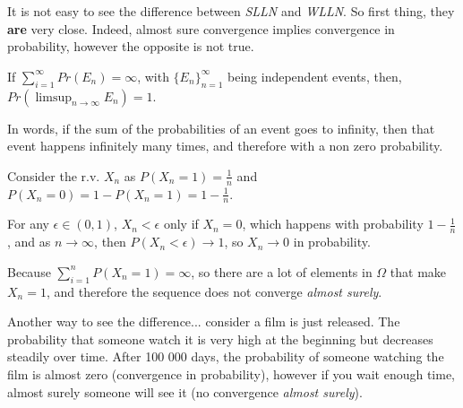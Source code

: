\documentclass[aspectratio=169]{beamer}
\begin{document}
\begin{frame}
    It is not easy to see the difference between \emph{SLLN} and \emph{WLLN}. So first thing, they \textbf{are} very close. Indeed, almost sure convergence implies convergence in probability, however the opposite is not true. 
\end{frame}

\begin{frame}
    \begin{lemma}
        If $\sum_{i=1}^\infty Pr(E_n)=\infty$, with $\{E_n\}_{n=1}^\infty$ being independent events, then, $Pr(\limsup_{n\rightarrow\infty
        }E_n)=1$.
    \end{lemma}
    \vspace{0.4cm}
    In words, if the sum of the probabilities of an event goes to infinity, then that event happens infinitely many times, and therefore with a non zero probability.
\end{frame}

\begin{frame}
    Consider the r.v. $X_n$ as $P(X_n=1)=\frac{1}{n}$ and $P(X_n=0)=1-P(X_n=1)=1-\frac{1}{n}$. 
    
    \vspace{0.3cm}
    
    For any $\epsilon\in(0,1)$, $X_n<\epsilon$ only if $X_n=0$, which happens with probability $1-\frac{1}{n}$, and as $n\rightarrow\infty$, then $P(X_n<\epsilon)\rightarrow 1$, so $X_n\rightarrow 0$ in probability.
    
    \vspace{0.3cm}
    
    Because $\sum_{i=1}^n P(X_n=1) =\infty$, so there are a lot of elements in $\Omega$ that make $X_n=1$, and therefore the sequence does not converge \emph{almost surely}.
    
\end{frame}

\begin{frame}
    Another way to see the difference... consider a film is just released. The probability that someone watch it is very high at the beginning but decreases steadily over time. After 100 000 days, the probability of someone watching the film is almost zero (convergence in probability), however if you wait enough time, almost surely someone will see it (no convergence \emph{almost surely}).
\end{frame}
\end{document}
